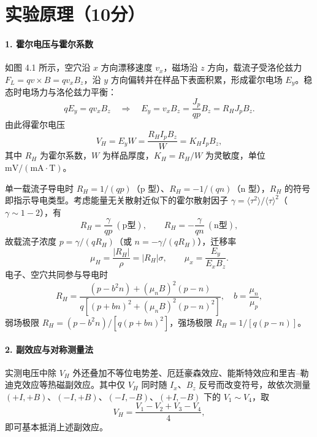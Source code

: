 \documentclass[12pt,a4paper]{ctexart}
\begin{document}
\section*{实验原理（10分）}
\paragraph{1. 霍尔电压与霍尔系数}
如图 4.1 所示，空穴沿 $x$ 方向漂移速度 $v_x$，磁场沿 $z$ 方向，载流子受洛伦兹力
$F_L=qv\times B=qv_xB_z$，沿 $y$ 方向偏转并在样品下表面积累，形成霍尔电场 $E_y$。稳态时电场力与洛伦兹力平衡：
\begin{equation}
    qE_y=qv_xB_z \quad\Rightarrow\quad E_y=v_xB_z=\frac{J_p}{qp}B_z=R_HJ_pB_z .
\end{equation}
由此得霍尔电压
\begin{equation}
    V_H=E_yW=\frac{R_HI_pB_z}{W}=K_HI_pB_z,
    \label{eq:VH}
\end{equation}
其中 $R_H$ 为霍尔系数，$W$ 为样品厚度，$K_H=R_H/W$ 为灵敏度，单位 $\mathrm{mV/(mA\cdot T)}$。

单一载流子导电时 $R_H=1/(qp)$（p 型）、$R_H=-1/(qn)$（n 型），$R_H$ 的符号即指示导电类型。考虑能量无关散射近似下的霍尔散射因子 $\gamma=\langle\tau^2\rangle/\langle\tau\rangle^2$（$\gamma\sim1\!-\!2$），有
\begin{equation}
    R_H=\frac{\gamma}{qp}\ (\text{p型}),\qquad R_H=-\frac{\gamma}{qn}\ (\text{n型}),
\end{equation}
故载流子浓度 $p=\gamma/(qR_H)$（或 $n=-\gamma/(qR_H)$），迁移率
\begin{equation}
    \mu_H=\frac{|R_H|}{\rho}=|R_H|\sigma,
    \qquad \mu_x=\frac{E_y}{E_xB_z}.
\end{equation}
电子、空穴共同参与导电时
\begin{equation}
    R_H=\frac{(p-b^2n)+(\mu_nB)^2(p-n)}{q\left[(p+bn)^2+(\mu_nB)^2(p-n)^2\right]},
    \quad b=\frac{\mu_n}{\mu_p},
\end{equation}
弱场极限 $R_H=(p-b^2n)/[q(p+bn)^2]$，强场极限 $R_H=1/[q(p-n)]$。

\paragraph{2. 副效应与对称测量法}
实测电压中除 $V_H$ 外还叠加不等位电势差、厄廷豪森效应、能斯特效应和里吉--勒迪克效应等热磁副效应。其中仅 $V_H$ 同时随 $I_x$、$B_z$ 反号而改变符号，故依次测量 $(+I,+B)$、$(-I,+B)$、$(-I,-B)$、$(+I,-B)$ 下的 $V_1\!\sim\!V_4$，取
\begin{equation}
    V_H=\frac{V_1-V_2+V_3-V_4}{4},
    \label{eq:sym}
\end{equation}
即可基本抵消上述副效应。
\end{document}
